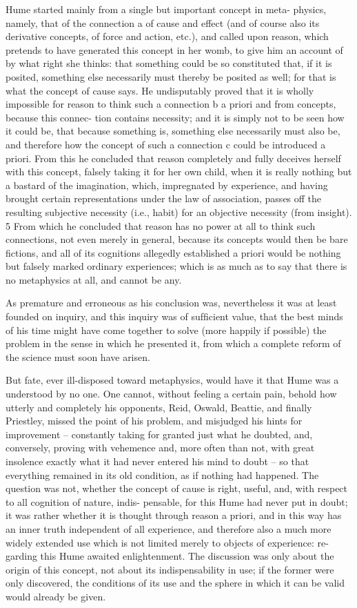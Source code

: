 Hume started mainly from a single but important concept in meta-
physics, namely, that of the connection a of cause and effect (and of course
also its derivative concepts, of force and action, etc.), and called upon
reason, which pretends to have generated this concept in her womb, to
give him an account of by what right she thinks: that something could
be so constituted that, if it is posited, something else necessarily must
thereby be posited as well; for that is what the concept of cause says.
He undisputably proved that it is wholly impossible for reason to think
such a connection b a priori and from concepts, because this connec-
tion contains necessity; and it is simply not to be seen how it could be,
that because something is, something else necessarily must also be, and
therefore how the concept of such a connection c could be introduced a
priori. From this he concluded that reason completely and fully deceives
herself with this concept, falsely taking it for her own child, when it is
really nothing but a bastard of the imagination, which, impregnated by
experience, and having brought certain representations under the law of
association, passes off the resulting subjective necessity (i.e., habit) for
an objective necessity (from insight). 5 From which he concluded that
reason has no power at all to think such connections, not even merely
in general, because its concepts would then be bare ﬁctions, and all of
its cognitions allegedly established a priori would be nothing but falsely
marked ordinary experiences; which is as much as to say that there is no
metaphysics at all, and cannot be any.

As premature and erroneous as his conclusion was, nevertheless it was
at least founded on inquiry, and this inquiry was of sufﬁcient value, that
the best minds of his time might have come together to solve (more
happily if possible) the problem in the sense in which he presented it,
from which a complete reform of the science must soon have arisen.

But fate, ever ill-disposed toward metaphysics, would have it that
Hume was a understood by no one. One cannot, without feeling a
certain pain, behold how utterly and completely his opponents, Reid,
Oswald, Beattie, and ﬁnally Priestley, missed the point of his problem, and
misjudged his hints for improvement – constantly taking for granted just
what he doubted, and, conversely, proving with vehemence and, more
often than not, with great insolence exactly what it had never entered
his mind to doubt – so that everything remained in its old condition, as
if nothing had happened. The question was not, whether the concept of
cause is right, useful, and, with respect to all cognition of nature, indis-
pensable, for this Hume had never put in doubt; it was rather whether
it is thought through reason a priori, and in this way has an inner truth
independent of all experience, and therefore also a much more widely
extended use which is not limited merely to objects of experience: re-
garding this Hume awaited enlightenment. The discussion was only
about the origin of this concept, not about its indispensability in use; if
the former were only discovered, the conditions of its use and the sphere
in which it can be valid would already be given.

